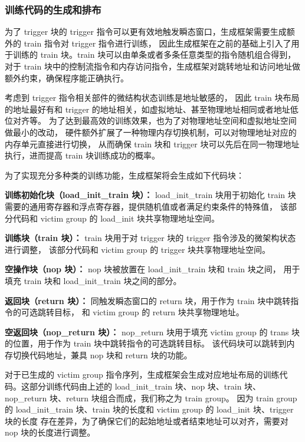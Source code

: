 \subsubsection{训练代码的生成和排布}

为了 trigger 块的 trigger 指令可以更有效地触发瞬态窗口，生成框架需要生成额外的 train 指令对 trigger 指令进行训练，
因此生成框架在之前的基础上引入了用于训练的 train 块。train 块可以由单条或者多条任意类型的指令随机组合得到，
对于 train 块中的控制流指令和内存访问指令，生成框架对跳转地址和访问地址做额外约束，确保程序能正确执行。\par

考虑到 trigger 指令相关部件的微结构状态训练是地址敏感的，
因此 train 块布局的地址最好有和 trigger 的地址相关，如虚拟地址、甚至物理地址相同或者地址低位对齐等。
为了达到最高效的训练效果，也为了对物理地址空间和虚拟地址空间做最小的改动，
硬件额外扩展了一种物理内存切换机制，可以对物理地址对应的内存单元直接进行切换，
从而确保 train 块和 trigger 块可以先后在同一物理地址执行，进而提高 train 块训练成功的概率。\par

为了实现充分多种类的训练功能，生成框架将会生成如下代码块：\par

\textbf{训练初始化块（load\_init\_train 块）：}
load\_init\_train 块用于初始化 train 块需要的通用寄存器和浮点寄存器，提供随机值或者满足约束条件的特殊值，
该部分代码和 victim group 的 load\_init 块共享物理地址空间。\par

\textbf{训练块（train 块）：}
train 块用于对 trigger 块的 trigger 指令涉及的微架构状态进行调整，
该部分代码和 victim group 的 trigger 块共享物理地址空间。

\textbf{空操作块（nop 块）：}
nop 块被放置在 load\_init\_train 块和 train 块之间，
用于填充 train 块和 load\_init\_train 块之间的部分。\par

\textbf{返回块（return 块）：}
同触发瞬态窗口的 return 块，用于作为 train 块中跳转指令的可选跳转目标，
和 victim group 的 return 块共享物理地址。\par

\textbf{空返回块（nop\_return 块）：}
nop\_return 块用于填充 victim group 的 trans 块的位置，用于作为 train 块中跳转指令的可选跳转目标。
该代码块可以跳转到内存切换代码地址，兼具 nop 块和 return 块的功能。\par

对于已生成的 victim group 指令序列，生成框架会生成对应地址布局的训练代码。这部分训练代码由上述的
load\_init\_train 块、nop 块、train 块、nop\_return 块、return 块组合而成，我们称之为 train group。
因为 train group 的 load\_init\_train 块、train 块的长度和 victim group 的 load\_init 块、trigger 块的长度
存在差异，为了确保它们的起始地址或者结束地址可以对齐，需要对 nop 块的长度进行调整。\par

